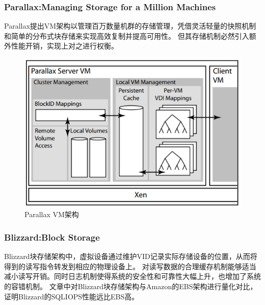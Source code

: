 \subsubsection{Parallax:Managing Storage for a Million Machines}
Parallax\cite{warfield2005parallax}提出VM架构以管理百万数量机群的存储管理，凭借灵活轻量的快照机制和简单的分布式块存储来实现高效复制并提高可用性。
但其存储机制必然引入额外性能开销，实现上对之进行权衡。

\begin{figure}
\centering
\includegraphics[scale=0.8]{Figures/storage/parallax.jpg}
\decoRule
\caption{Parallax VM架构}
\label{fig:parallax}
\end{figure}
\subsubsection{Blizzard:Block Storage}
Blizzard\cite{mickens2014blizzard}块存储架构中，虚拟设备通过维护VID记录实际存储设备的位置，从而将得到的读写指令转发到相应的物理设备上。
对读写数据的合理缓存机制能够适当减小读写开销。同时日志机制使得系统的安全性和可靠性大幅上升，也增加了系统的容错机制。
文章中对Blizzard块存储架构与Amazon的EBS架构进行量化对比，证明Blizzard的SQLIOPS性能远比EBS高。

